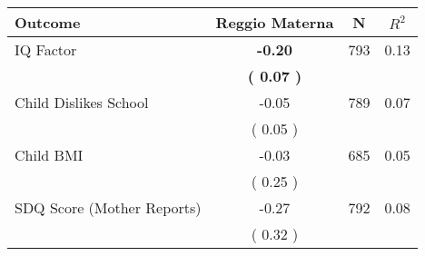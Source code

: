 \begin{tabular}{lccc}
\toprule
 \textbf{Outcome} & \textbf{Reggio Materna} & \textbf{N} & \textbf{$ R^2$} \\
\midrule
IQ Factor & \textbf{    -0.20} & 793 &      0.13 \\ 
 & \textbf{(     0.07 )} & \\
Child Dislikes School &     -0.05 & 789 &      0.07 \\ 
 & (     0.05 ) & \\
Child BMI &     -0.03 & 685 &      0.05 \\ 
 & (     0.25 ) & \\
SDQ Score (Mother Reports) &     -0.27 & 792 &      0.08 \\ 
 & (     0.32 ) & \\
\bottomrule
\end{tabular}

